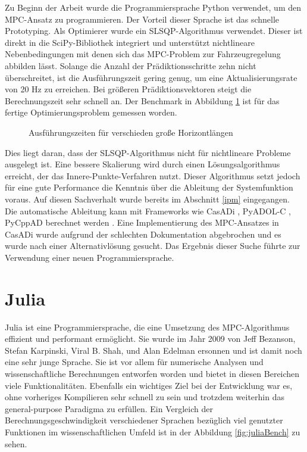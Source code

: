 \documentclass{like}
\begin{document}
Zu Beginn der Arbeit wurde die Programmiersprache Python verwendet, um den \ac{MPC}-Ansatz zu programmieren. Der Vorteil dieser Sprache ist das schnelle Prototyping. Als Optimierer wurde ein \ac{SLSQP}-Algorithmus verwendet. Dieser ist direkt in die SciPy-Bibliothek \cite{Scipy} integriert und unterstützt nicht\-li\-ne\-are Nebenbedingungen mit denen sich das \ac{MPC}-Problem zur Fahrzeugregelung abbilden lässt. Solange die Anzahl der Prädiktionsschritte zehn nicht überschreitet, ist die Aus\-füh\-rungs\-zeit gering genug, um eine Aktualisierungsrate von 20 Hz zu erreichen. Bei größeren Prä\-dikt\-ions\-vek\-tor\-en steigt die Berechnungszeit sehr schnell an. Der Benchmark in Abbildung \ref{fig:pythonBench} ist für das fertige Optimierungsproblem gemessen worden.
\begin{figure}[ht!]
	\centering
	 
	\caption{Ausführungszeiten für verschieden  große Horizontlängen}
	\label{fig:pythonBench}
\end{figure}
Dies liegt daran, dass der \ac{SLSQP}-Algorithmus nicht für nichtlineare Probleme ausgelegt ist. Eine bessere Skalierung wird durch einen Lösungsalgorithmus erreicht, der das Innere-Punkte-Verfahren nutzt. Dieser Algorithmus setzt jedoch für eine gute Performance die Kenntnis über die Ableitung der Systemfunktion voraus. Auf diesen Sachverhalt wurde bereits im Abschnitt \ref{ipm} eingegangen. Die automatische Ableitung kann mit Frameworks wie CasADi \cite{CasADi}, PyADOL-C \cite{PYADOLC}, PyCppAD \cite{CppAD} berechnet werden \cite{DBLP:journals/corr/TurkinT16}. 
Eine Implementierung des \ac{MPC}-Ansatzes in CasADi wurde  aufgrund der schlechten Dokumentation abgebrochen und es wurde nach einer Alternativlösung gesucht. Das Ergebnis dieser Suche führte zur Verwendung einer neuen Programmiersprache. 


\section{Julia}
\label{julia}
Julia ist eine Programmiersprache, die eine Umsetzung des \ac{MPC}-Algorithmus effizient und performant ermöglicht. Sie wurde im Jahr 2009 von Jeff Bezanson, Stefan Karpinski, Viral B. Shah, und Alan Edelman ersonnen und ist damit noch eine sehr junge Sprache. Sie ist vor allem für numerische Analysen und wissenschaftliche Berechnungen entworfen worden und bietet in diesen Bereichen viele Funktionalitäten. Ebenfalls ein wichtiges Ziel bei der Entwicklung war es, ohne vorheriges Kompilieren sehr schnell zu sein und trotzdem weiterhin das general-purpose Paradigma zu erfüllen. Ein Vergleich der Berechnungsgeschwindigkeit verschiedener Sprachen bezüglich viel genutzter Funktionen im wissenschaftlichen Umfeld ist in der Abbildung \ref{fig:juliaBench} zu sehen.
\end{document}

